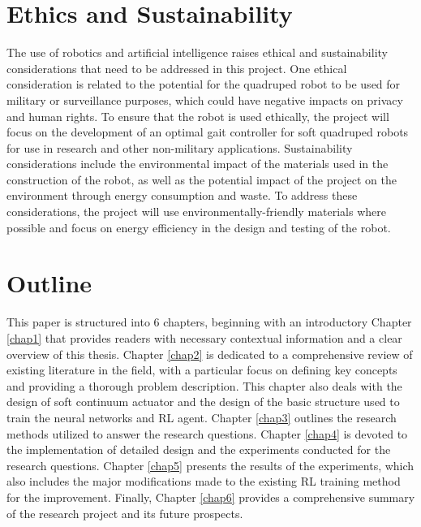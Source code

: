 \section{Ethics and Sustainability}
The use of robotics and artificial intelligence raises ethical and sustainability considerations that need to be addressed in this project. One ethical consideration is related to the potential for the quadruped robot to be used for military or surveillance purposes, which could have negative impacts on privacy and human rights. To ensure that the robot is used ethically, the project will focus on the development of an optimal gait controller for soft quadruped robots for use in research and other non-military applications. Sustainability considerations include the environmental impact of the materials used in the construction of the robot, as well as the potential impact of the project on the environment through energy consumption and waste. To address these considerations, the project will use environmentally-friendly materials where possible and focus on energy efficiency in the design and testing of the robot.

\section{Outline}
This paper is structured into 6 chapters, beginning with an introductory Chapter \ref{chap1} that provides readers with necessary contextual information and a clear overview of this thesis. Chapter \ref{chap2} is dedicated to a comprehensive review of existing literature in the field, with a particular focus on defining key concepts and providing a thorough problem description. This chapter also deals with the design of soft continuum actuator and the design of the basic structure used to train the neural networks and \ac{RL} agent. Chapter \ref{chap3} outlines the research methods utilized to answer the research questions. Chapter \ref{chap4} is devoted to the implementation of detailed design and the experiments conducted for the research questions. Chapter \ref{chap5} presents the results of the experiments, which also includes the major modifications made to the existing \ac{RL} training method for the improvement. Finally, Chapter \ref{chap6} provides a comprehensive summary of the research project and its future prospects.
